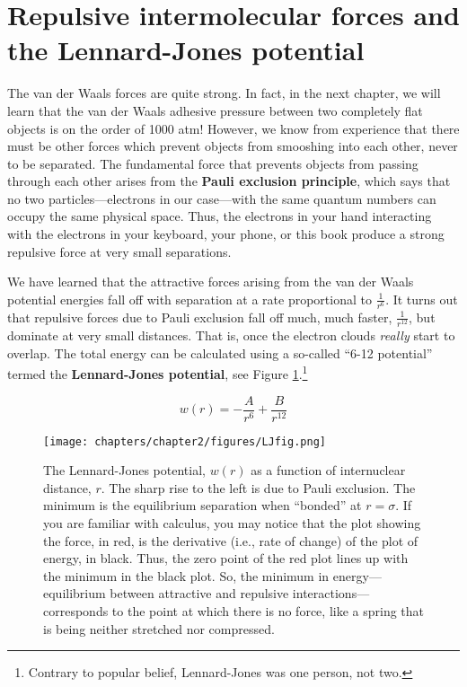 \section{Repulsive intermolecular forces and the Lennard-Jones potential}

The van der Waals forces are quite strong. In fact, in the next chapter, we will learn that the van der Waals adhesive pressure between two completely flat objects is on the order of 1000 atm! However, we know from experience that there must be other forces which prevent objects from smooshing into each other, never to be separated. The fundamental force that prevents objects from passing through each other arises from the \textbf{Pauli exclusion principle}, which says that no two particles---electrons in our case---with the same quantum numbers can occupy the same physical space. Thus, the electrons in your hand interacting with the electrons in your keyboard, your phone, or this book produce a strong repulsive force at very small separations.

We have learned that the attractive forces arising from the van der Waals potential energies fall off with separation at a rate proportional to $\frac{1}{r^6}$. It turns out that repulsive forces due to Pauli exclusion fall off much, much faster, $\frac{1}{r^{12}}$, but dominate at very small distances. That is, once the electron clouds \textit{really} start to overlap. The total energy can be calculated using a so-called ``6-12 potential'' termed the \textbf{Lennard-Jones potential}, see Figure \ref{fig:LJfig}.\footnote{Contrary to popular belief, Lennard-Jones was one person, not two.}

\begin{equation}
    \label{Lennard-Jones potential}
    w(r)=-\frac{A}{r^6}+\frac{B}{r^{12}}
\end{equation}

\begin{figure}[h!]
\centering
  \texttt{[image: chapters/chapter2/figures/LJfig.png]}
  \caption{The Lennard-Jones potential, $w(r)$ as a function of internuclear distance, $r$. The sharp rise to the left is due to Pauli exclusion. The minimum is the equilibrium separation when ``bonded'' at $r=\sigma$. If you are familiar with calculus, you may notice that the plot showing the force, in red, is the derivative (i.e., rate of change) of the plot of energy, in black. Thus, the zero point of the red plot lines up with the minimum in the black plot. So, the minimum in energy---equilibrium between attractive and repulsive interactions---corresponds to the point at which there is no force, like a spring that is being neither stretched nor compressed.}
  \label{fig:LJfig}
\end{figure}

